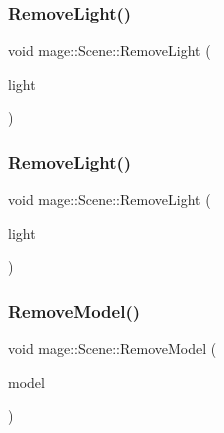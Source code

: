 \subsubsection{\texorpdfstring{Remove\+Light()}{RemoveLight()}\hspace{0.1cm}{\footnotesize\ttfamily [1/2]}}
{\footnotesize\ttfamily void mage\+::\+Scene\+::\+Remove\+Light (\begin{DoxyParamCaption}\item[{\hyperlink{namespacemage_a1e01ae66713838a7a67d30e44c67703e}{Shared\+Ptr}$<$ \hyperlink{namespacemage_a85082c7e15a2bbf19b1753b7de6c45db}{Omni\+Light\+Node} $>$}]{light }\end{DoxyParamCaption})\hspace{0.3cm}{\ttfamily [private]}}

\hypertarget{classmage_1_1_scene_a371c31d030990b9fa641271c4c733d87}{}\label{classmage_1_1_scene_a371c31d030990b9fa641271c4c733d87} 
\subsubsection{\texorpdfstring{Remove\+Light()}{RemoveLight()}\hspace{0.1cm}{\footnotesize\ttfamily [2/2]}}
{\footnotesize\ttfamily void mage\+::\+Scene\+::\+Remove\+Light (\begin{DoxyParamCaption}\item[{\hyperlink{namespacemage_a1e01ae66713838a7a67d30e44c67703e}{Shared\+Ptr}$<$ \hyperlink{namespacemage_a46c8f54b869a5dc07f520c600b9046bd}{Spot\+Light\+Node} $>$}]{light }\end{DoxyParamCaption})\hspace{0.3cm}{\ttfamily [private]}}

\hypertarget{classmage_1_1_scene_a1b66a3d247eaa143234d15d72aa67a85}{}\label{classmage_1_1_scene_a1b66a3d247eaa143234d15d72aa67a85} 
\subsubsection{\texorpdfstring{Remove\+Model()}{RemoveModel()}}
{\footnotesize\ttfamily void mage\+::\+Scene\+::\+Remove\+Model (\begin{DoxyParamCaption}\item[{\hyperlink{namespacemage_a1e01ae66713838a7a67d30e44c67703e}{Shared\+Ptr}$<$ \hyperlink{classmage_1_1_model_node}{Model\+Node} $>$}]{model }\end{DoxyParamCaption})\hspace{0.3cm}{\ttfamily [private]}}

